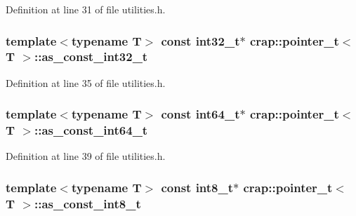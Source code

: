 Definition at line 31 of file utilities.\+h.

\hypertarget{structcrap_1_1pointer__t_a9d42c28d7e4642583907174295bef068}{
\subsubsection[{as\+\_\+const\+\_\+int32\+\_\+t}]{\setlength{\rightskip}{0pt plus 5cm}template$<$typename T$>$ const int32\+\_\+t$\ast$ {\bf crap\+::pointer\+\_\+t}$<$ T $>$\+::as\+\_\+const\+\_\+int32\+\_\+t}}\label{structcrap_1_1pointer__t_a9d42c28d7e4642583907174295bef068}


Definition at line 35 of file utilities.\+h.

\hypertarget{structcrap_1_1pointer__t_aa450d0a7bc03e4a67cce1e2f4bb034eb}{
\subsubsection[{as\+\_\+const\+\_\+int64\+\_\+t}]{\setlength{\rightskip}{0pt plus 5cm}template$<$typename T$>$ const int64\+\_\+t$\ast$ {\bf crap\+::pointer\+\_\+t}$<$ T $>$\+::as\+\_\+const\+\_\+int64\+\_\+t}}\label{structcrap_1_1pointer__t_aa450d0a7bc03e4a67cce1e2f4bb034eb}


Definition at line 39 of file utilities.\+h.

\hypertarget{structcrap_1_1pointer__t_a9ce77bbce5a72d780ed726c9c91549d9}{
\subsubsection[{as\+\_\+const\+\_\+int8\+\_\+t}]{\setlength{\rightskip}{0pt plus 5cm}template$<$typename T$>$ const int8\+\_\+t$\ast$ {\bf crap\+::pointer\+\_\+t}$<$ T $>$\+::as\+\_\+const\+\_\+int8\+\_\+t}}\label{structcrap_1_1pointer__t_a9ce77bbce5a72d780ed726c9c91549d9}


